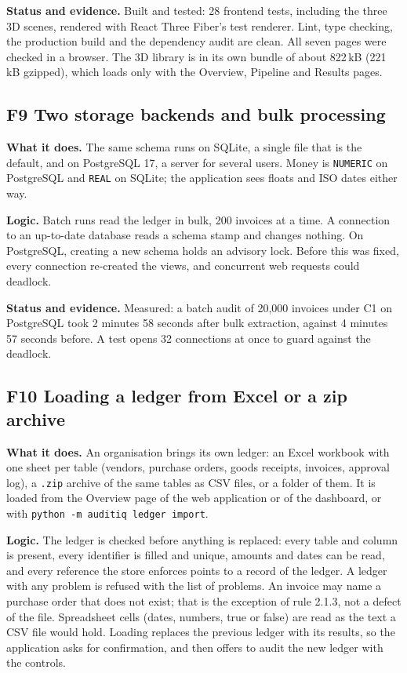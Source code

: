 \documentclass[11pt,a4paper]{article}
\begin{document}
\textbf{Status and evidence.} Built and tested: 28 frontend tests, including the three 3D scenes, rendered with React Three Fiber's test renderer. Lint, type checking, the production build and the dependency audit are clean. All seven pages were checked in a browser. The 3D library is in its own bundle of about 822\,kB (221\,kB gzipped), which loads only with the Overview, Pipeline and Results pages.

\subsection{F9 Two storage backends and bulk processing}
\textbf{What it does.} The same schema runs on SQLite, a single file that is the default, and on PostgreSQL 17, a server for several users. Money is \texttt{NUMERIC} on PostgreSQL and \texttt{REAL} on SQLite; the application sees floats and ISO dates either way.

\textbf{Logic.} Batch runs read the ledger in bulk, 200 invoices at a time. A connection to an up-to-date database reads a schema stamp and changes nothing. On PostgreSQL, creating a new schema holds an advisory lock. Before this was fixed, every connection re-created the views, and concurrent web requests could deadlock.

\textbf{Status and evidence.} Measured: a batch audit of 20,000 invoices under C1 on PostgreSQL took 2 minutes 58 seconds after bulk extraction, against 4 minutes 57 seconds before. A test opens 32 connections at once to guard against the deadlock.

\subsection{F10 Loading a ledger from Excel or a zip archive}
\textbf{What it does.} An organisation brings its own ledger: an Excel workbook with one sheet per table (vendors, purchase orders, goods receipts, invoices, approval log), a \texttt{.zip} archive of the same tables as CSV files, or a folder of them. It is loaded from the Overview page of the web application or of the dashboard, or with \texttt{python -m auditiq ledger import}.

\textbf{Logic.} The ledger is checked before anything is replaced: every table and column is present, every identifier is filled and unique, amounts and dates can be read, and every reference the store enforces points to a record of the ledger. A ledger with any problem is refused with the list of problems. An invoice may name a purchase order that does not exist; that is the exception of rule 2.1.3, not a defect of the file. Spreadsheet cells (dates, numbers, true or false) are read as the text a CSV file would hold. Loading replaces the previous ledger with its results, so the application asks for confirmation, and then offers to audit the new ledger with the controls.
\end{document}
